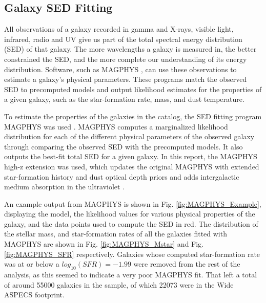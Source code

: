 \subsection{Galaxy SED Fitting}

All observations of a galaxy recorded in gamma and X-rays, visible light, infrared, radio and UV give us part of the total spectral energy distribution (SED) of that galaxy. The more wavelengths a galaxy is measured in, the better constrained the SED, and the more complete our understanding of its energy distribution. Software, such as MAGPHYS \cite{da2008simple, da2015alma}, can use these observations to estimate a galaxy's physical parameters. These programs match the observed SED to precomputed models and output likelihood estimates for the properties of a given galaxy, such as the star-formation rate, mass, and dust temperature.

To estimate the properties of the galaxies in the catalog, the SED fitting program MAGPHYS was used \cite{da2008simple, da2015alma}. MAGPHYS computes a marginalized likelihood distribution for each of the different physical parameters of the observed galaxy through comparing the observed SED with the precomputed models. It also outputs the best-fit total SED for a given galaxy. In this report, the MAGPHYS high-z extension was used, which updates the original MAGPHYS with extended star-formation history and dust optical depth priors and adds intergalactic medium absorption in the ultraviolet \cite{da2015alma}.

An example output from MAGPHYS is shown in Fig. \ref{fig:MAGPHYS_Example}, displaying the model, the likelihood values for various physical properties of the galaxy, and the data points used to compute the SED in red. The distribution of the stellar mass, and star-formation rates of all the galaxies fitted with MAGPHYS are shown in Fig. \ref{fig:MAGPHYS_Mstar} and Fig. \ref{fig:MAGPHYS_SFR} respectively. Galaxies whose computed star-formation rate was at or below a $log_{10}(SFR) = -1.99$ were removed from the rest of the analysis, as this seemed to indicate a very poor MAGPHYS fit. That left a total of around 55000 galaxies in the sample, of which 22073 were in the Wide ASPECS footprint.

